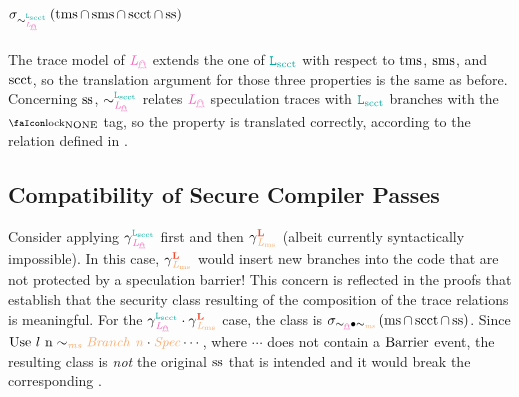 \documentclass[acmsmall]{acmart}
\theoremstyle{definition}
\begin{document}
\paragraph{$\sigma_{\sim^{\Lscct}_{\Lspec}}\left(\tmssafe\cap\smssafe\cap\scctsafe\cap\sssafe\right)$}
The trace model of $\Lspec$ extends the one of $\Lscct$ with respect to $\operatorname{tms}$, $\operatorname{sms}$, and $\operatorname{scct}$, so the translation argument for those three properties is the same as before.
% 
Concerning $\operatorname{ss}$, $\sim^{\Lscct}_{\Lspec}$ relates $\Lspec$ speculation traces with $\Lscct$ branches with the $\lock_{\text{NONE}}$ tag, so the property is translated correctly, according to the relation defined in .


\subsection{Compatibility of Secure Compiler Passes}\label{subsec:compatsecpasses}

Consider applying $\ccspec$ first and then $\ccb$ (albeit currently syntactically impossible).
In this case, $\ccb$ would insert new branches into the code that are not protected by a speculation barrier! 
This concern is reflected in the proofs that establish that the security class resulting of the composition of the trace relations is meaningful.
For the $\ccspec\cdot\ccb$ case, the class is $\sigma_{\sim_{\ird{\mathghost}}\bullet\sim_{\irl{ms}}}\left(\mssafe\cap\scctsafe\cap\sssafe\right)$.
Since $\ev{Use\ \loc\ n}\sim_{\irl{ms}}\irl{Branch\ n}\cdot\irl{Spec}\cdots$, where $\cdots$ does not contain a $\text{{Barrier}}$ event, the resulting class is \emph{not} the original $\operatorname{ss}$ that is intended and it would break the corresponding .
\end{document}
